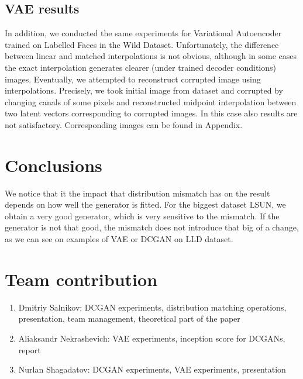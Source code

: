 \documentclass{article}
\begin{document}
\subsection{VAE results}
In addition, we conducted the same experiments for Variational Autoencoder trained on Labelled Faces in the Wild Dataset. Unfortunately, the difference between linear and matched interpolations is not obvious, although in some cases the exact interpolation generates clearer (under trained decoder conditions) images. Eventually, we attempted to reconstruct corrupted image using interpolations. Precisely, we took initial image from dataset and corrupted by changing canals of some pixels and reconstructed midpoint interpolation between two latent vectors corresponding to corrupted images. In this case also results are not satisfactory. Corresponding images can be found in Appendix. 


\section{Conclusions}
We notice that it the impact that distribution mismatch has on the result depends on how well the generator is fitted. For the biggest dataset LSUN, we obtain a very good generator, which is very sensitive to the mismatch. If the generator is not that good, the mismatch does not introduce that big of a change, as we can see on examples of VAE or DCGAN on LLD dataset.


\section{Team contribution}
\begin{enumerate}
        \item Dmitriy Salnikov: DCGAN experiments,
            distribution matching operations, presentation,
            team management, theoretical part of the paper
        \item Aliaksandr Nekrashevich: VAE experiments,
            inception score for DCGANs, report
        \item Nurlan Shagadatov: DCGAN experiments, VAE experiments, presentation
\end{enumerate}




\newpage
\appendix
\end{document}
